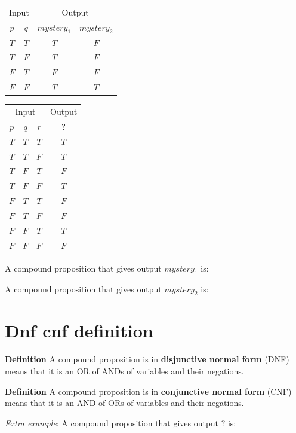 \documentclass[12pt, oneside]{article}
\begin{document}
\begin{center}
\begin{tabular}{cc||cc}
\multicolumn{2}{c||}{Input}  &\multicolumn{2}{c}{Output}\\
$p$ & $q$& $mystery_1$ & $mystery_2$\\
\hline
$T$ & $T$  & $T$ & $F$\\
$T$ & $F$  & $T$ & $F$\\
$F$ & $T$  & $F$ & $F$\\
$F$ & $F$  & $T$ & $T$\\
\end{tabular}
\qquad \qquad
\begin{tabular}{ccc||c}
\multicolumn{3}{c||}{Input}  & Output\\
$p$ & $q$ & $r$  &  ?\\
\hline
$T$ & $T$  & $T$ & $T$ \\
$T$ & $T$  & $F$ & $T$ \\
$T$ & $F$  & $T$ & $F$ \\
$T$ & $F$  & $F$ & $T$ \\
$F$ & $T$  & $T$ & $F$ \\
$F$ & $T$  & $F$ & $F$ \\
$F$ & $F$  & $T$ & $T$ \\
$F$ & $F$  & $F$ & $F$ \\
\end{tabular}

\end{center}


A compound proposition that  gives output $mystery_1$ is: \underline{\phantom{\hspace{3in}}}


\vfill


A compound proposition that  gives output $mystery_2$ is: \underline{\phantom{\hspace{3in}}}


\vfill \vfill
\section*{Dnf cnf definition}


{\bf  Definition} A compound proposition is in {\bf disjunctive normal form}  (DNF) means
that  it is an OR of ANDs of variables and their negations.

{\bf  Definition} A compound proposition is in {\bf conjunctive normal form}  (CNF) means
that  it is an AND of ORs of variables and their negations.


{\it Extra example}: A compound proposition that  gives output ? is: 
\end{document}
